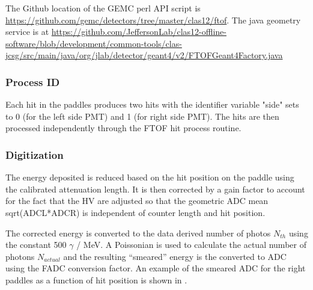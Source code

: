 The Github location of the GEMC perl API script is \url{https://github.com/gemc/detectors/tree/master/clas12/ftof}.
The java geometry service is at
\url{https://github.com/JeffersonLab/clas12-offline-software/blob/development/common-tools/clas-jcsg/src/main/java/org/jlab/detector/geant4/v2/FTOFGeant4Factory.java}

\subsubsection{Process ID}

Each hit in the paddles produces two hits with the identifier variable "side" sets to 0 (for the left side PMT) and 1 (for right side PMT).
The hits are then processed independently through the FTOF hit process routine.

\subsubsection{Digitization}

The energy deposited is reduced based on the hit position on the paddle using the calibrated attenuation length. It is then corrected by a gain factor
to account for the fact that the HV are adjusted so that the geometric ADC mean sqrt(ADCL*ADCR) is independent of counter length and hit position.

The corrected energy is converted to the data derived number of photos $N_{th}$ using the constant 500 $\gamma$ / MeV. A Poissonian is used to
calculate the actual number of photons $N_{actual}$ and the resulting ``smeared'' energy is the converted to ADC using the FADC conversion factor.
An example of the smeared ADC for the right paddles as a function of hit position is shown in .

